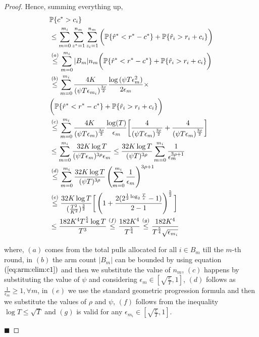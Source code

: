\begin{proof}
Hence, summing everything up, 
\begin{align*}
&\mathbb{P}\lbrace c^{*} > c_i \rbrace \\
&\leq \sum_{m=0}^{m_i}\sum_{z^* =1}^{n_{m}}\sum_{z_i =1}^{n_{m}}\bigg(\mathbb{P}\lbrace \hat{r}^* < r^* - c^{*}\rbrace + \mathbb{P}\lbrace \hat{r}_i > r_i + c_i\rbrace\bigg)\\
&\overset{(a)}{\leq} \sum_{m=0}^{m_i}|B_{m}|n_{m}\bigg(\mathbb{P}\lbrace \hat{r}^* < r^* - c^{*}\rbrace + \mathbb{P}\lbrace \hat{r}_i > r_i + c_i\rbrace\bigg)\\
&\overset{(b)}{\leq} \sum_{m=0}^{m_i}\dfrac{4K}{(\psi T \epsilon_{m_i})^{\frac{3\rho}{2}}}\dfrac{\log{(\psi T\epsilon_{m}^{2})}}{2\epsilon_{m}}\times 
\\
&\bigg(\mathbb{P}\lbrace \hat{r}^* < r^* - c^{*}\rbrace + \mathbb{P}\lbrace \hat{r}_i > r_i + c_i\rbrace\bigg)\\
&\overset{(c)}{\leq} \sum_{m=0}^{m_i}\dfrac{4K}{(\psi T \epsilon_{m})^{\frac{3\rho}{2}}}\dfrac{\log(T)}{\epsilon_{m}}\bigg[\frac{4}{(\psi T\epsilon_{m})^{\frac{3\rho}{2}}} + \frac{4}{(\psi T\epsilon_{m})^{\frac{3\rho}{2}}}  \bigg]\\
&\leq \sum_{m=0}^{m_i}\dfrac{32K\log T}{(\psi T\epsilon_{m})^{3\rho}\epsilon_{m}} \leq 
\dfrac{32K\log T}{(\psi T)^{3\rho}}\sum_{m=0}^{m_i}\dfrac{1}{\epsilon_{m}^{3\rho + 1}} \\
&\overset{(d)}{\leq} \sum_{m=0}^{m_i}\dfrac{32K\log T}{(\psi T)^{3\rho}}\left(\sum_{m=0}^{m_i}\dfrac{1}{\epsilon_{m}}\right)^{3\rho + 1}\\
&\overset{(e)}{\leq} 
\dfrac{32 K\log T}{(\frac{T^2}{K^2})^{\frac{3}{2}}}\bigg[\left( 1 + \dfrac{2(2^{ \frac{1}{2}\log_{2} \frac{T}{e}}-1)}{2-1} \right)^{\frac{5}{2}}\bigg] \\
&\leq \dfrac{182 K^4 T^{\frac{5}{4}}\log T}{T^3} \overset{(f)}{\leq} \dfrac{182 K^4}{T^{\frac{5}{4}}} \overset{(g)}{\leq} \dfrac{182 K^4}{T^{\frac{5}{4}}\sqrt{\epsilon_{m_i}}}
\end{align*}

where, $(a)$ comes from the total pulls allocated for all $i\in B_m$ till the $m$-th round, in $(b)$ the arm count $|B_m|$ can be bounded by using equation $(\ref{eq:arm:elim:c1})$ and then we substitute the value of $n_{m}$, $(c)$ happens by substituting the value of $\psi$ and considering $\epsilon_{m}\in [\sqrt{\frac{e}{T}},1]$, $(d)$ follows as $\frac{1}{\epsilon_{m}}\geq 1,\forall m $, in $(e)$ we use the standard geometric progression formula and then we substitute the values of $\rho$ and $\psi$, $(f)$ follows from the inequality $\log T \leq \sqrt{T}$ and $(g)$ is valid for any $\epsilon_{m_i}\in[\sqrt{\frac{e}{T}},1]$. 

\hfill $\blacksquare$	
\end{proof}


